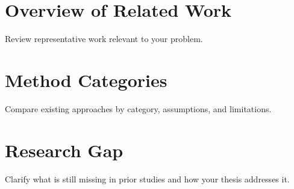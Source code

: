\section{Overview of Related Work}

Review representative work relevant to your problem.

\section{Method Categories}

Compare existing approaches by category, assumptions, and limitations.

\section{Research Gap}

Clarify what is still missing in prior studies and how your thesis addresses it.
